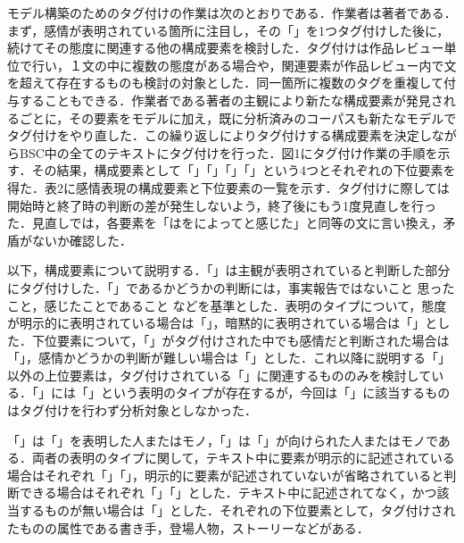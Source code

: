 \documentclass[japanese]{jnlp_1.3a}
\def\maru#1{}
\begin{document}
モデル構築のためのタグ付けの作業は次のとおりである．作業者は著者である．まず，感情が表明されている箇所に注目し，その「」を1つタグ付けした後に，続けてその態度に関連する他の構成要素を検討した．タグ付けは作品レビュー単位で行い，１文の中に複数の態度がある場合や，関連要素が作品レビュー内で文を超えて存在するものも検討の対象とした．同一箇所に複数のタグを重複して付与することもできる．作業者である著者の主観により新たな構成要素が発見されるごとに，その要素をモデルに加え，既に分析済みのコーパスも新たなモデルでタグ付けをやり直した．この繰り返しによりタグ付けする構成要素を決定しながらBSC中の全てのテキストにタグ付けを行った．図1にタグ付け作業の手順を示す．その結果，構成要素として「」「」「」「」という4つとそれぞれの下位要素を得た．表2に感情表現の構成要素と下位要素の一覧を示す．タグ付けに際しては開始時と終了時の判断の差が発生しないよう，終了後にもう1度見直しを行った．見直しでは，各要素を「はをによってと感じた」と同等の文に言い換え，矛盾がないか確認した．

\begin{table}[t]

\end{table}

以下，構成要素について説明する．「」は主観が表明されていると判断した部分にタグ付けした．「」であるかどうかの判断には，\maru{1}事実報告ではないこと 
\maru{2}思ったこと，感じたことであること 
などを基準とした．表明のタイプについて，態度が明示的に表明されている場合は「」，暗黙的に表明されている場合は「」とした．下位要素について，「」がタグ付けされた中でも感情だと判断された場合は「」，感情かどうかの判断が難しい場合は「」とした．これ以降に説明する「」以外の上位要素は，タグ付けされている「」に関連するもののみを検討している．「」には「」という表明のタイプが存在するが，今回は「」に該当するものはタグ付けを行わず分析対象としなかった． 


「」は「」を表明した人またはモノ，「」は「」が向けられた人またはモノである．両者の表明のタイプに関して，テキスト中に要素が明示的に記述されている場合はそれぞれ「」「」，明示的に要素が記述されていないが省略されていると判断できる場合はそれぞれ「」「」とした．テキスト中に記述されてなく，かつ該当するものが無い場合は「」とした．それぞれの下位要素として，タグ付けされたものの属性である書き手，登場人物，ストーリーなどがある． 
\end{document}
